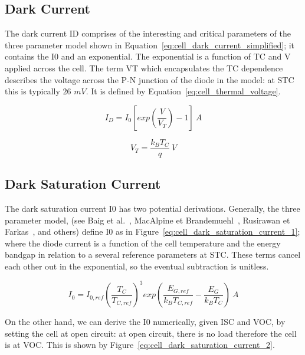 \subsection*{Dark Current}

The dark current \ac{ID} comprises of the interesting and critical parameters of
the three parameter model shown in
Equation~\ref{eq:cell_dark_current_simplified}; it contains the \ac{I0} and an
exponential. The exponential is a function of \ac{TC} and \ac{V} applied across
the cell. The term \ac{VT} which encapsulates the \ac{TC} dependence describes
the voltage across the P-N junction of the diode in the model: at \ac{STC} this
is typically $26$ $mV$. It is defined by Equation~\ref{eq:cell_thermal_voltage}.

\begin{equation}
    I_D = I_0[exp(\frac{V}{V_T}) - 1]~A
    \label{eq:cell_dark_current_simplified}
\end{equation}

\begin{equation}
    V_T = \frac{k_BT_C}{q}~V
    \label{eq:cell_thermal_voltage}
\end{equation}

\subsection*{Dark Saturation Current}

The dark saturation current \ac{I0} has two potential derivations.
Generally, the three parameter model, (see Baig et al.~\cite{baig_et_al},
MacAlpine et Brandemuehl~\cite{macalpine_et_brandemuehl}, Rusirawan et
Farkas~\cite{rusirawan_et_farkas}, and others) define \ac{I0} as in
Figure~\ref{eq:cell_dark_saturation_current_1}; where the diode current is a
function of the cell temperature and the energy bandgap in relation to a
several reference parameters at \ac{STC}. These terms cancel each other out in
the exponential, so the eventual subtraction is unitless.

\begin{equation}
    I_0 = I_{0,ref}(\frac{T_C}{T_{C,ref}})^3exp(\frac{E_{G,ref}}{k_BT_{C,ref}} - \frac{E_G}{k_BT_C})~A
    \label{eq:cell_dark_saturation_current_1}
\end{equation}

On the other hand, we can derive the \ac{I0} numerically, given \ac{ISC} and
\ac{VOC}, by setting the cell at open circuit: at open circuit, there is no load
therefore the cell is at \ac{VOC}. This is shown by
Figure~\ref{eq:cell_dark_saturation_current_2}.

